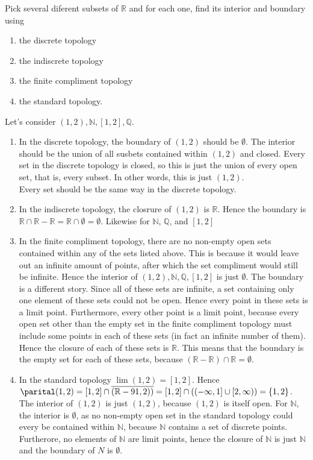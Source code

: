 \documentclass{article}
\theoremstyle{definition}
\newcommand{\R}{\mathbb{R}}
\newcommand{\N}{\mathbb{N}}
\newcommand{\Q}{\mathbb{Q}}
\begin{document}
 Pick several diferent subsets of $\R$ and for each one, find its interior and boundary using
\begin{enumerate}
    \item the discrete topology
    \item the indiscrete topology
    \item the finite compliment topology
    \item the standard topology.
\end{enumerate}
 Let's consider $(1,2), \N, [1,2], \Q$.
\begin{enumerate}
    \item In the discrete topology,
the boundary of $(1,2)$ should be $\emptyset$. The interior should be the union of all susbets contained within $(1,2)$ and closed. Every set in the discrete topology is closed, so this is just the union of every open set, that is, every subset. In other words, this is just $(1,2)$.\\

Every set should be the same way in the discrete topology.
\item In the indiscrete topology, the closrure of $(1,2)$ is $\R$. Hence the boundary is $\R \cap \R-\R = \R \cap \emptyset = \emptyset$. Likewise for $\N$, $\Q$, and $[1,2]$
\item In the finite compliment topology, there are no non-empty open sets contained within any of the sets listed above. This is because it would leave out an infinite amount of points, after which the set compliment would still be infinite. Hence the interior of $(1,2), \N,\Q, [1,2]$ is just $\emptyset$. The boundary is a different story. Since all of these sets are infinite, a set containing only one element of these sets could not be open. Hence every point in these sets is a limit point. Furthermore, every other point is a limit point, because every open set other than the empty set in the finite compliment topology must include some points in each of these sets (in fact an infinite number of them). Hence the closure of each of these sets is $\R$. This means that the boundary is the empty set for each of these sets, because $(\R-\R)\cap \R = \emptyset$. 
\item In the standard topology $\lim (1,2) = [1,2]$. Hence $\parital (1,2) = [1,2]\cap\overline{(\R-91,2))} = [1,2]\cap ((-\infty,1]\cup [2,\infty)) = \{1,2\}$. The interior of $(1,2)$ is just $(1,2)$, because $(1,2)$ is itself open. For $\N$, the interior is $\emptyset$, as no non-empty open set in the standard topology could every be contained within $\N$, because $\N$ contains a set of discrete points. Furtherore, no elements of $\N$ are limit points, hence the closure of $\N$ is just $\N$ and the boundary of $N$ is $\emptyset$.
\end{enumerate}
\end{document}
